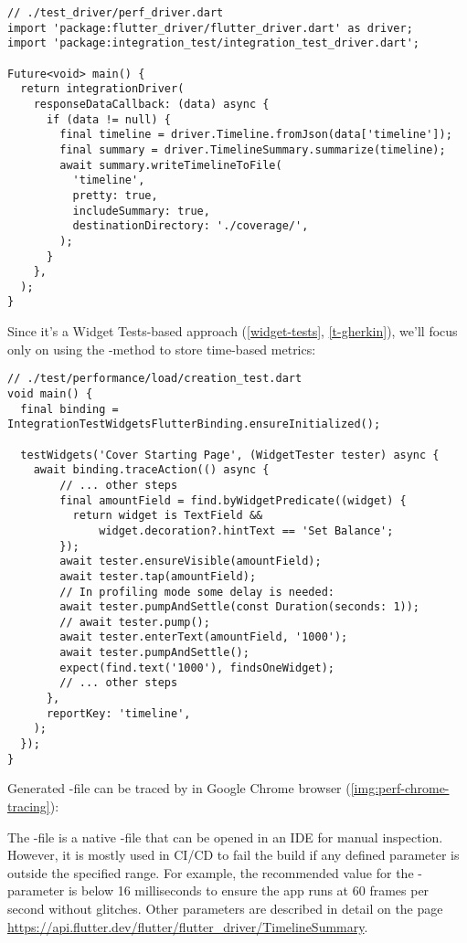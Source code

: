 \begin{lstlisting}
// ./test_driver/perf_driver.dart
import 'package:flutter_driver/flutter_driver.dart' as driver;
import 'package:integration_test/integration_test_driver.dart';

Future<void> main() {
  return integrationDriver(
    responseDataCallback: (data) async {
      if (data != null) {
        final timeline = driver.Timeline.fromJson(data['timeline']);
        final summary = driver.TimelineSummary.summarize(timeline);
        await summary.writeTimelineToFile(
          'timeline',
          pretty: true,
          includeSummary: true,
          destinationDirectory: './coverage/',
        );
      }
    },
  );
}
\end{lstlisting}

\noindent Since it's a Widget Tests-based approach (\ref{widget-tests}, \ref{t-gherkin}), we'll focus only on using the 
-method to store time-based metrics:

\begin{lstlisting}
// ./test/performance/load/creation_test.dart
void main() {
  final binding = IntegrationTestWidgetsFlutterBinding.ensureInitialized();

  testWidgets('Cover Starting Page', (WidgetTester tester) async {
    await binding.traceAction(() async {
        // ... other steps
        final amountField = find.byWidgetPredicate((widget) {
          return widget is TextField && 
              widget.decoration?.hintText == 'Set Balance';
        });
        await tester.ensureVisible(amountField);
        await tester.tap(amountField);
        // In profiling mode some delay is needed:
        await tester.pumpAndSettle(const Duration(seconds: 1));
        // await tester.pump();
        await tester.enterText(amountField, '1000');
        await tester.pumpAndSettle();
        expect(find.text('1000'), findsOneWidget);
        // ... other steps
      },
      reportKey: 'timeline',
    );
  });
}
\end{lstlisting}

\noindent Generated -file can be traced by  in Google Chrome browser 
(\cref{img:perf-chrome-tracing}):


\noindent The -file is a native -file that can be opened in an IDE for manual 
inspection. However, it is mostly used in CI/CD to fail the build if any defined parameter is outside the specified 
range. For example, the recommended value for the -parameter is below 16 
milliseconds to ensure the app runs at 60 frames per second without glitches. Other parameters are described in detail 
on the page 
\href{https://api.flutter.dev/flutter/flutter\_driver/TimelineSummary/summaryJson.html}{https://api.flutter.dev/flutter/flutter\_driver/TimelineSummary}.


